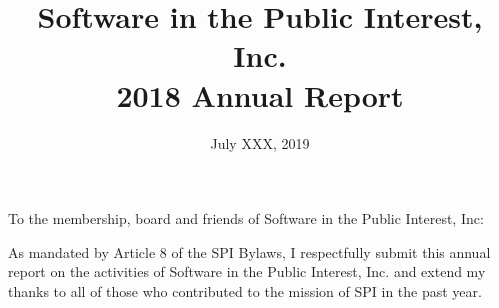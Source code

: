 \documentclass[a4paper]{report}
\begin{document}
\title{Software in the Public Interest, Inc.\\
2018 Annual Report}
\date{July XXX, 2019}

\maketitle

\newpage


\hspace{1em}

To the membership, board and friends of Software in the Public Interest, Inc:

As mandated by Article 8 of the SPI Bylaws, I respectfully submit this annual
report on the activities of Software in the Public Interest, Inc. and extend my
thanks to all of those who contributed to the mission of SPI in the past year.
\end{document}
